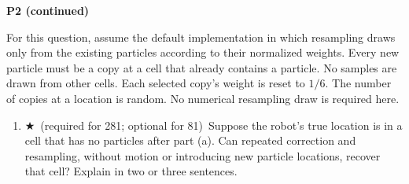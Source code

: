 \documentclass[11pt]{article}
\newcommand{\gradstar}{$\bigstar$~\textsf{\small (required for 281; optional for 81)}~}
\newenvironment{studentanswer}[1]
  {\par\medskip\noindent
   \begin{tcolorbox}[height from=#1 to 100cm, colback=white, colframe=gray!60,
     boxrule=0.6pt, arc=0pt, outer arc=0pt, left=7pt, right=7pt,
     top=7pt, bottom=7pt, title={Answer / work}, fonttitle=\small,
     coltitle=black, colbacktitle=gray!8, titlerule=0pt]
   \ignorespaces}
  {\end{tcolorbox}\par}
\begin{document}
\clearpage
\noindent\textbf{P2 (continued)}

For this question, assume the default implementation in which resampling
draws only from the existing particles according to their normalized
weights. Every new particle must be a copy at a cell that already contains
a particle. No samples are drawn from other cells. Each selected copy's
weight is reset to $1/6$. The number of copies at a location is random.
No numerical resampling draw is required here.
\begin{enumerate}[label=(\alph*),start=4]
\item \begin{minipage}[t]{\linewidth} \gradstar Suppose the robot's true location is in a cell that has
no particles after part (a). Can repeated correction and resampling,
without motion or introducing new particle locations, recover that cell?
Explain in two or three sentences.

\begin{studentanswer}{3cm}
\end{studentanswer}

\end{minipage}
\end{enumerate}

\clearpage
\end{document}
